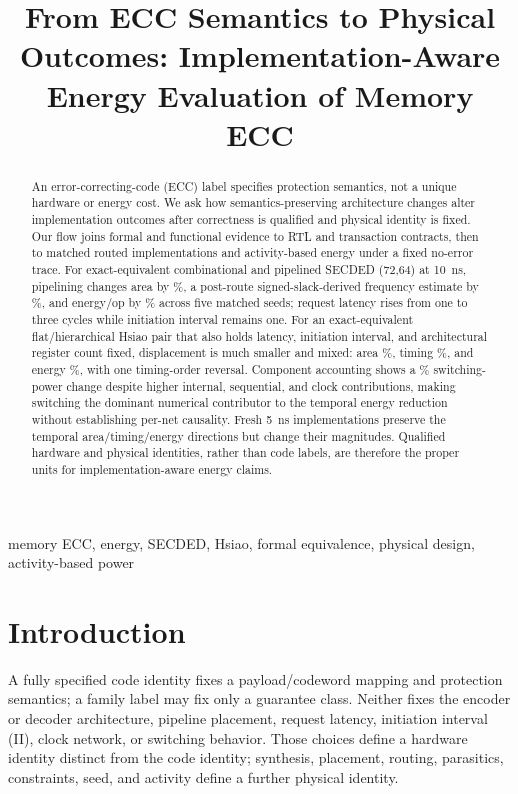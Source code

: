 \documentclass[conference,10pt]{IEEEtran}
\title{From ECC Semantics to Physical Outcomes: Implementation-Aware Energy Evaluation of Memory ECC}
\author{\IEEEauthorblockN{Anonymous submission}}
\begin{document}
\maketitle

\begin{abstract}
An error-correcting-code (ECC) label specifies protection semantics, not a unique hardware or energy cost. We ask how semantics-preserving architecture changes alter implementation outcomes after correctness is qualified and physical identity is fixed. Our flow joins formal and functional evidence to RTL and transaction contracts, then to matched routed implementations and activity-based energy under a fixed no-error trace. For exact-equivalent combinational and pipelined SECDED (72,64) at 10~ns, pipelining changes area by \SecAreaMean\%, a post-route signed-slack-derived frequency estimate by \SecFreqMean\%, and energy/op by \SecEnergyMean\% across five matched seeds; request latency rises from one to three cycles while initiation interval remains one. For an exact-equivalent flat/hierarchical Hsiao pair that also holds latency, initiation interval, and architectural register count fixed, displacement is much smaller and mixed: area \HsAreaMean\%, timing \HsFreqMean\%, and energy \HsEnergyMean\%, with one timing-order reversal. Component accounting shows a \PowerSwitchingEffect\% switching-power change despite higher internal, sequential, and clock contributions, making switching the dominant numerical contributor to the temporal energy reduction without establishing per-net causality. Fresh 5~ns implementations preserve the temporal area/timing/energy directions but change their magnitudes. Qualified hardware and physical identities, rather than code labels, are therefore the proper units for implementation-aware energy claims.
\end{abstract}

\begin{IEEEkeywords}
memory ECC, energy, SECDED, Hsiao, formal equivalence, physical design, activity-based power
\end{IEEEkeywords}

\section{Introduction}

A fully specified code identity fixes a payload/codeword mapping and protection semantics; a family label may fix only a guarantee class. Neither fixes the encoder or decoder architecture, pipeline placement, request latency, initiation interval (II), clock network, or switching behavior. Those choices define a hardware identity distinct from the code identity; synthesis, placement, routing, parasitics, constraints, seed, and activity define a further physical identity.
\end{document}
